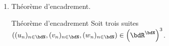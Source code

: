 \documentclass[a4paper,french,bookmarks]{article}
\begin{document}
\begin{enumerate}
{        La suite $\left(\dfrac{1}{u_n}\right)_{n \geq n_0}$ étant donc bien définie à partir d'un certain rang, on peut donc l'étudier. Donc :
        
        \[ \exists n_0 \in \bdN,\ \forall n \in \bdN,\qquad n \geq n_0 \implies \mod{\dfrac{1}{u_n} - \dfrac{1}{l}} = \mod{\dfrac{l-u_n}{lu_n}} = \mod{u_n -l}\times\dfrac{1}{\mod{l}}\times\dfrac{1}{\mod{u_n}}\]
        Or $\mod{u} \lima \mod{l}$ donc:
        
        \[\exists n_1 \in \bdN,\ \forall n \in \bdN,\ n \geq n_1 \implies \mod{\mod{u_n} - \mod{l}} \leq \dfrac{\mod{l}}{2} \implies \mod{l} - \mod{u_n} \leq \dfrac{\mod{l}}{2} \implies \mod{u_n} \geq \dfrac{\mod{l}}{2}\]
        Donc $\exists n_1 \in \bdN$, $\forall n \in \bdN$, $n \geq n_1 \implies \dfrac{1}{\mod{u_n}} \leq \dfrac{2}{\mod{l}}$, donc :
        \[ \exists (n_0, n_1) \in \bdN^2,\ \forall n \in \bdN,\qquad n \geq \max{n_0, n_1} \implies \mod{\dfrac{1}{u_n} - \dfrac{1}{l}} \leq \mod{u_n - l}\times\dfrac{2}{l^2}\]
        Par définition de la convergence de $u$ vers $l$ :
        \[ \forall \epsilon \in \bdR_+,\ \exists n_2 \in \bdN,\ \forall n \in \bdN,\qquad n \geq n_2 \implies \mod{u_n - l} \leq \epsilon \dfrac{ l^2}{2}\]
        Finalement :
        \[\forall \epsilon \in \bdR_+,\ \exists (n_0, n_1, n_2) \in \bdN^3,\ \forall n \in \bdN,\qquad n \geq \max{n_0, n_1, n_2} \implies \mod{\dfrac{1}{u_n} - \dfrac{1}{l}} \leq \epsilon\]
        Donc par définition, 
    }
    
    \item Théorème d'encadrement.
    
    \begin{theorem*}{Théorème d'encadrement}{}
        Soit trois suites $\left((u_n)_{n \in \bdN}, (v_n)_{n \in \bdN}, (w_n)_{n \in \bdN}\right) \in \left(\bdR^\bdN\right)^3$.
        

\end{theorem*}
\end{enumerate}
\end{document}
